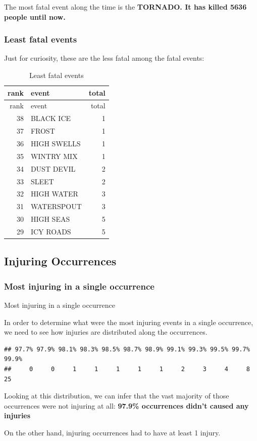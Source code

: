 \documentclass[]{article}
\begin{document}
The most fatal event along the time is the \textbf{TORNADO. It has
killed 5636 people until now.}

\subsubsection{Least fatal events}\label{least-fatal-events}

Just for curiosity, these are the less fatal among the fatal events:

\begin{longtable}[]{@{}rlr@{}}
\caption{Least fatal events}\tabularnewline
\toprule
rank & event & total\tabularnewline
\midrule
\endfirsthead
\toprule
rank & event & total\tabularnewline
\midrule
\endhead
38 & BLACK ICE & 1\tabularnewline
37 & FROST & 1\tabularnewline
36 & HIGH SWELLS & 1\tabularnewline
35 & WINTRY MIX & 1\tabularnewline
34 & DUST DEVIL & 2\tabularnewline
33 & SLEET & 2\tabularnewline
32 & HIGH WATER & 3\tabularnewline
31 & WATERSPOUT & 3\tabularnewline
30 & HIGH SEAS & 5\tabularnewline
29 & ICY ROADS & 5\tabularnewline
\bottomrule
\end{longtable}

\subsection{Injuring Occurrences}\label{injuring-occurrences}

\subsubsection{Most injuring in a single
occurrence}\label{most-injuring-in-a-single-occurrence}

Most injuring in a single occurrence

In order to determine what were the most injuring events in a single
occurrence, we need to see how injuries are distributed along the
occurrences.

\begin{verbatim}
## 97.7% 97.9% 98.1% 98.3% 98.5% 98.7% 98.9% 99.1% 99.3% 99.5% 99.7% 99.9% 
##     0     0     1     1     1     1     1     2     3     4     8    25
\end{verbatim}

Looking at this distribution, we can infer that the vast majority of
those occurrences were not injuring at all: \textbf{97.9\% occurrences
didn't caused any injuries}

On the other hand, injuring occurrences had to have at least 1 injury.
\end{document}
